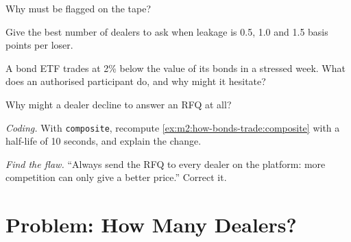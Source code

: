 \begin{exercise}[$\star$]\label{exo:m2:how-bonds-trade:3}
Why must  be flagged on the tape?
\end{exercise}

\begin{exercise}[$\star\star$]\label{exo:m2:how-bonds-trade:4}
Give the best number of dealers to ask when leakage is 0.5, 1.0 and 1.5 basis points
per loser.
\end{exercise}

\begin{exercise}[$\star\star$]\label{exo:m2:how-bonds-trade:5}
A bond ETF trades at 2\% below the value of its bonds in a stressed week. What does an
authorised participant do, and why might it hesitate?
\end{exercise}

\begin{exercise}[$\star\star$]\label{exo:m2:how-bonds-trade:6}
Why might a dealer decline to answer an RFQ at all?
\end{exercise}

\begin{exercise}[$\star\star\star$]\label{exo:m2:how-bonds-trade:7}
\emph{Coding.} With \texttt{composite}, recompute \cref{ex:m2:how-bonds-trade:composite}
with a half-life of 10 seconds, and explain the change.
\end{exercise}

\begin{exercise}[$\star\star\star$]\label{exo:m2:how-bonds-trade:8}
\emph{Find the flaw.} ``Always send the RFQ to every dealer on the platform: more
competition can only give a better price.'' Correct it.
\end{exercise}

\section{Problem: How Many Dealers?}

